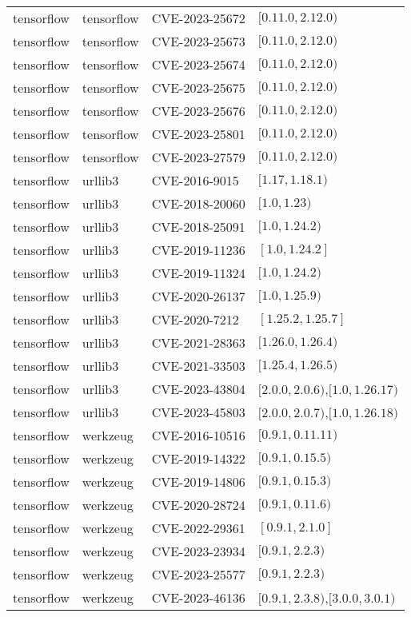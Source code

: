 \begin{tabular}{llll}
tensorflow & tensorflow & CVE-2023-25672 & $[0.11.0,2.12.0)$ \\
tensorflow & tensorflow & CVE-2023-25673 & $[0.11.0,2.12.0)$ \\
tensorflow & tensorflow & CVE-2023-25674 & $[0.11.0,2.12.0)$ \\
tensorflow & tensorflow & CVE-2023-25675 & $[0.11.0,2.12.0)$ \\
tensorflow & tensorflow & CVE-2023-25676 & $[0.11.0,2.12.0)$ \\
tensorflow & tensorflow & CVE-2023-25801 & $[0.11.0,2.12.0)$ \\
tensorflow & tensorflow & CVE-2023-27579 & $[0.11.0,2.12.0)$ \\
tensorflow & urllib3 & CVE-2016-9015 & $[1.17,1.18.1)$ \\
tensorflow & urllib3 & CVE-2018-20060 & $[1.0,1.23)$ \\
tensorflow & urllib3 & CVE-2018-25091 & $[1.0,1.24.2)$ \\
tensorflow & urllib3 & CVE-2019-11236 & $[1.0,1.24.2]$ \\
tensorflow & urllib3 & CVE-2019-11324 & $[1.0,1.24.2)$ \\
tensorflow & urllib3 & CVE-2020-26137 & $[1.0,1.25.9)$ \\
tensorflow & urllib3 & CVE-2020-7212 & $[1.25.2,1.25.7]$ \\
tensorflow & urllib3 & CVE-2021-28363 & $[1.26.0,1.26.4)$ \\
tensorflow & urllib3 & CVE-2021-33503 & $[1.25.4,1.26.5)$ \\
tensorflow & urllib3 & CVE-2023-43804 & $[2.0.0,2.0.6)$,$[1.0,1.26.17)$ \\
tensorflow & urllib3 & CVE-2023-45803 & $[2.0.0,2.0.7)$,$[1.0,1.26.18)$ \\
tensorflow & werkzeug & CVE-2016-10516 & $[0.9.1,0.11.11)$ \\
tensorflow & werkzeug & CVE-2019-14322 & $[0.9.1,0.15.5)$ \\
tensorflow & werkzeug & CVE-2019-14806 & $[0.9.1,0.15.3)$ \\
tensorflow & werkzeug & CVE-2020-28724 & $[0.9.1,0.11.6)$ \\
tensorflow & werkzeug & CVE-2022-29361 & $[0.9.1,2.1.0]$ \\
tensorflow & werkzeug & CVE-2023-23934 & $[0.9.1,2.2.3)$ \\
tensorflow & werkzeug & CVE-2023-25577 & $[0.9.1,2.2.3)$ \\
tensorflow & werkzeug & CVE-2023-46136 & $[0.9.1,2.3.8)$,$[3.0.0,3.0.1)$ \\
\bottomrule
\end{tabular}
